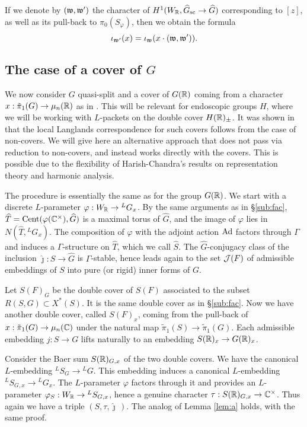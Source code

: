\documentclass{article}
\theoremstyle{definition}
\numberwithin{equation}{section}
\renewcommand{\-}{\hyp{}}
\begin{document}
If we denote by $(\mathfrak{w},\mathfrak{w'})$ the character of $H^1(W_{\mathbb{R}},\widehat G_{\textrm{sc}} \to \widehat G)$ corresponding to $[z]$, as well as its pull-back to $\pi_0(S_\varphi)$, then we obtain the formula
\begin{equation}
	\iota_{\mathfrak{w'}}(x) = \iota_{\mathfrak{w}}(x \cdot (\mathfrak{w},\mathfrak{w'})).
\end{equation}


\subsection{The case of a cover of $G$} \label{sub:packetcover}

We now consider $G$ quasi-split and a cover of $G(\mathbb{R})$ coming from a character $x : \tilde\pi_1(G) \to \mu_n(\mathbb{R})$ as in \cite{KalHDC}. This will be relevant for endoscopic groups $H$, where we will be working with $L$\-packets on the double cover $H(\mathbb{R})_\pm$. It was shown in \cite[\S2.6]{KalHDC} that the local Langlands correspondence for such covers follows from the case of non-covers. We will give here an alternative approach that does not pass via reduction to non-covers, and instead works directly with the covers. This is possible due to the flexibility of Harish-Chandra's results on representation theory and harmonic analysis.

The procedure is essentially the same as for the group $G(\mathbb{R})$. We start with a discrete $L$\-parameter $\varphi : W_{\mathbb{R}} \to {^LG_x}$. By the same arguments as in \S\ref{sub:fac}, $\widehat T = \textrm{Cent}(\varphi(\mathbb{C}^\times),\widehat G)$ is a maximal torus of $\hat G$, and the image of $\varphi$ lies in $N(\hat T,{^LG_x})$. The composition of $\varphi$ with the adjoint action $\textrm{Ad}$ factors through $\Gamma$ and induces a $\Gamma$-structure on $\hat T$, which we call 
$\hat S$. The $\hat G$-conjugacy class of the inclusion $\hat\jmath : \hat S \to \hat G$ is $\Gamma$-stable, hence leads again to the set $\mathcal{J}(F)$ of admissible embeddings of $S$ into pure (or rigid) inner forms of $G$.

Let $S(F)_G$ be the double cover of $S(F)$ associated to the subset $R(S,G) \subset X^*(S)$. It is the same double cover as in \S\ref{sub:fac}. Now we have another double cover, called $S(F)_x$, coming from the pull-back of $x : \tilde\pi_1(G) \to \mu_n(\mathbb{C})$ under the natural map $\tilde\pi_1(S) \to \tilde\pi_1(G)$. Each admissible embedding $j : S \to G$ lifts naturally to an embedding $S(\mathbb{R})_x \to G(\mathbb{R})_x$.

Consider the Baer sum $S(\mathbb{R})_{G,x}$ of the two double covers. We have the canonical $L$\-embedding $^LS_G \to {^LG}$. This embedding induces a canonical $L$\-embedding ${^LS_{G,x}} \to {^LG_x}$. The $L$-parameter $\varphi$ factors through it and provides an $L$-parameter $\varphi_S : W_{\mathbb{R}} \to {^LS_{G,x}}$, hence a genuine character $\tau : S(\mathbb{R})_{G,x} \to \mathbb{C}^\times$. Thus again we have a triple $(S,\tau,\hat\jmath\,)$. The analog of Lemma \ref{lem:a} holds, with the same proof.
\end{document}
